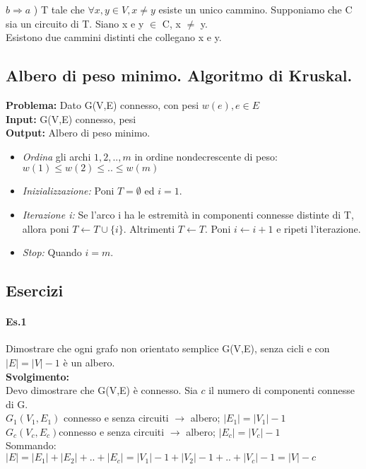 $b \Rightarrow a$ ) T tale che \(\forall x,y \in V, x \neq y\) esiste un unico cammino.
Supponiamo che C sia un circuito di T. Siano x e y $\in$ C, x $\neq$ y. \\
Esistono due cammini distinti che collegano x e y.

\subsection{Albero di peso minimo. Algoritmo di Kruskal.}
\textbf{Problema:} Dato G(V,E) connesso, con pesi \( w(e), e \in E\) \\
\textbf{Input:} G(V,E) connesso, pesi \\
\textbf{Output:} Albero di peso minimo.
\begin{itemize}
\item \emph{Ordina} gli archi ${1, 2, .., m}$ in ordine nondecrescente di peso: \( w(1)\leq w(2)\leq .. \leq w(m)\)
\item \emph{Inizializzazione:} Poni $T=\emptyset$ ed $i=1$.
\item \emph{Iterazione i:} Se l'arco i ha le estremità in componenti connesse distinte di T, allora poni
\(T \leftarrow T \cup \{i\} \). Altrimenti \(T \leftarrow T\). Poni \(i \leftarrow i+1\) e ripeti l'iterazione.
\item \emph{Stop:} Quando $i=m$.
\end{itemize}

\subsection{Esercizi}
\paragraph{Es.1}
Dimostrare che ogni grafo non orientato semplice G(V,E), senza cicli e con \(|E|=|V|-1\) è un albero. \\

\textbf{Svolgimento:} \\
Devo dimostrare che G(V,E) è connesso. Sia $c$ il numero di componenti connesse di G. \\

\noindent
\(G_1(V_1,E_1)\) connesso e senza circuiti $\rightarrow$ albero; \( |E_1| = |V_1| -1 \) \\
\(G_c(V_c,E_c) \)connesso e senza circuiti $\rightarrow$ albero; \( |E_c| = |V_c| -1 \) \\
Sommando: \(|E|=|E_1|+ |E_2| + .. + |E_c| = |V_1|-1 + |V_2|-1 + .. + |V_c|-1 = |V| - c\) \\

